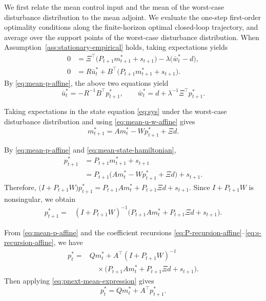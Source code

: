 \documentclass[10pt,journal,twoside]{IEEEtran}
\theoremstyle{definition}
\theoremstyle{remark}
\begin{document}
We first relate the mean control input and the mean of the worst-case
disturbance distribution to the mean adjoint. We evaluate the one-step first-order optimality conditions along the finite-horizon optimal closed-loop trajectory, and average over the support points of the worst-case disturbance distribution. When Assumption~\ref{ass:stationary-empirical} holds,  taking expectations yields
\begin{align*}
    0&=\Xi^\top\big(P_{t+1}m_{t+1}^*+s_{t+1}\big)-\lambda\big(\bar{w}_t^*-d\big),\\
    0&=R\bar{u}_t^*+B^\top\big(P_{t+1}m_{t+1}^*+s_{t+1}\big).
\end{align*}
By \eqref{eq:mean-p-affine}, the above two equations yield
\begin{equation}
	\bar{u}_t^*
	=
	-R^{-1}B^\top p_{t+1}^*,
	\qquad
	\bar{w}_t^*
	=
	d+\lambda^{-1}\Xi^\top p_{t+1}^* .
	\label{eq:mean-u-w-affine}
\end{equation}

Taking expectations in the state equation \eqref{eq:sys} under the worst-case disturbance distribution and using \eqref{eq:mean-u-w-affine} gives
\begin{equation}
	m_{t+1}^*
	=
	Am_t^*
	-Wp_{t+1}^*
	+\Xi d .
	\label{eq:mean-state-hamiltonian}
\end{equation}


By \eqref{eq:mean-p-affine} and \eqref{eq:mean-state-hamiltonian},
\[
	\begin{aligned}
		p_{t+1}^*
		&=
		P_{t+1}m_{t+1}^*
		+s_{t+1} \\
		&=
		P_{t+1}
		\big(
		Am_t^*
		-Wp_{t+1}^*
		+\Xi d
		\big)
		+s_{t+1} .
	\end{aligned}
\]
Therefore,
\(
	\big(I+P_{t+1}W\big)p_{t+1}^*
	=
	P_{t+1}A m_t^*
	+P_{t+1}\Xi d
	+s_{t+1} .
\)
Since \(I+P_{t+1}W\) is nonsingular, we obtain
\begin{equation}
	\begin{aligned}
		p_{t+1}^*
		=
		&(I\!+\!P_{t+1}W)^{-1}
		\big(
		P_{t+1}A m_t^*
		\!+\!P_{t+1}\Xi d
		\!+\!s_{t+1}
		\big).
	\end{aligned}
	\label{eq:pnext-mean-expression}
\end{equation}

 From
\eqref{eq:mean-p-affine} and the coefficient recursions
\eqref{eq:P-recursion-affine}--\eqref{eq:s-recursion-affine}, we have
\begin{equation*}
	\begin{aligned}
		p_t^*
		={}&
		Qm_t^*
		+
		A^\top
		(I+P_{t+1}W)^{-1} \\
		&\quad\times
		\big(
		P_{t+1}A m_t^*
		+P_{t+1}\Xi d
		+s_{t+1}
		\big).
	\end{aligned}
\end{equation*}
Then applying \eqref{eq:pnext-mean-expression} gives
\begin{equation}
	p_t^*=Qm_t^*+A^\top p_{t+1}^* .
	\label{eq:mean-adjoint-hamiltonian}
\end{equation}
\end{document}
